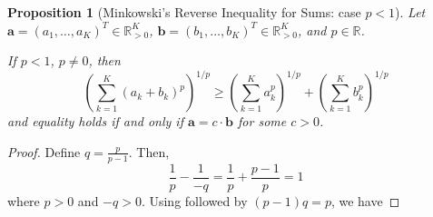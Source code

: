 \documentclass[10pt]{article} %
\newtheorem{proposition}{Proposition}[section]
\begin{document}
\begin{proposition}[Minkowski's Reverse Inequality for Sums: case $p < 1$]\label{proposition: reverse minkowski}
Let $\mathbf{a} = (a_1,\dots,a_K)^T \in \mathbb{R}^K_{>0}$, $\mathbf{b} = (b_1,\dots,b_K)^T \in \mathbb{R}^K_{>0}$, and $ p \in \mathbb{R}$.

If $ p < 1 $, $ p \neq 0 $, then
\begin{equation}
\left( \sum_{k=1}^K (a_k + b_k)^p \right)^{1/p} \geq \left( \sum_{k=1}^K a_k^p \right)^{1/p} + \left( \sum_{k=1}^K b_k^p \right)^{1/p}
\end{equation}
and equality holds if and only if $\mathbf{a} = c \cdot \mathbf{b}$ for some $c>0$.
\end{proposition}
\begin{proof}
Define $q = \frac{p}{p-1}$. Then,
\begin{equation}
\frac{1}{p} - \frac{1}{-q} = \frac{1}{p} + \frac{p-1}{p} = 1
\end{equation}
where $p > 0$ and $-q>0$. Using  followed by $(p-1)q = p$, we have


\end{proof}
\end{document}
